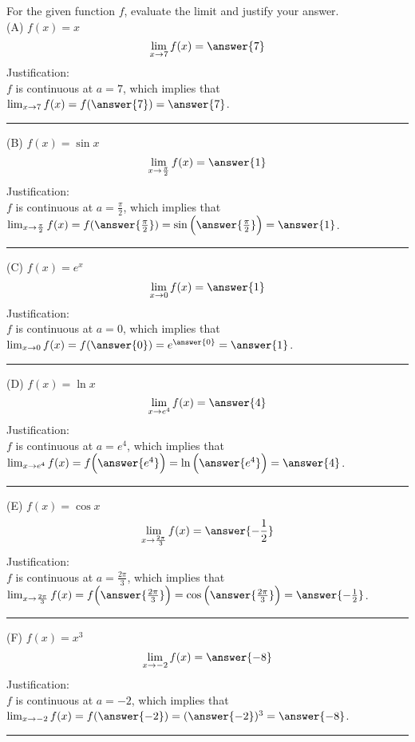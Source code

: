 \documentclass{ximera}
\author{Nela Lakos}
\begin{document}
\begin{exercise}


For the given function $f$, evaluate the limit and justify your answer.\\



(A) $f(x)=x$
 \[
\lim_{x\to 7}f(x) = \answer{7}
\] 
Justification:\\ $f$ is continuous at $a=7$, which implies that
$\lim_{x\to 7}f(x)=f(\answer{7})=\answer{7}$.

\noindent\rule[0.5ex]{\linewidth}{.2pt}

(B) $f(x)=\sin{x}$
 \[
\lim_{x\to \frac{\pi}{2}}f(x) = \answer{1}
\] 
Justification:\\ $f$ is continuous at $a=\frac{\pi}{2}$, which implies that\\[1em]
$\lim_{x\to \frac{\pi}{2}}f(x)=f(\answer{\frac{\pi}{2}})=\sin{\Bigl(\answer{\frac{\pi}{2}}\Bigr)}=\answer{1}$.

\noindent\rule[0.5ex]{\linewidth}{.2pt}

(C) $f(x)=e^{x}$
 \[
\lim_{x\to 0}f(x) = \answer{1}
\] 
Justification:\\ $f$ is continuous at $a=0$, which implies that\\[1em]
$\lim_{x\to 0}f(x)=f(\answer{0})=e^{\answer{0}}=\answer{1}$.

\noindent\rule[0.5ex]{\linewidth}{.2pt}
(D) $f(x)=\ln{x}$
 \[
\lim_{x\to e^{4}}f(x) = \answer{4}
\] 
Justification:\\ $f$ is continuous at $a=e^{4}$, which implies that\\[1em]
$\lim_{x\to e^{4}}f(x)=f\Bigl(\answer{e^{4}}\Bigr)=\ln{\Bigl(\answer{e^{4}}\Bigr)}=\answer{4}$.

\noindent\rule[0.5ex]{\linewidth}{.2pt}
(E) $f(x)=\cos{x}$
 \[
\lim_{x\to \frac{2\pi}{3}}f(x) = \answer{-\frac{1}{2}}
\] 
Justification:\\ $f$ is continuous at $a= \frac{2\pi}{3}$, which implies that\\[1em]
$\lim_{x\to \frac{2\pi}{3}}f(x)=f\Bigl(\answer{ \frac{2\pi}{3}}\Bigr)=\cos{\Bigl(\answer{ \frac{2\pi}{3}}\Bigr)}=\answer{-\frac{1}{2}}$.

\noindent\rule[0.5ex]{\linewidth}{.2pt}
(F) $f(x)=x^3$
 \[
\lim_{x\to -2}f(x) = \answer{-8}
\] 
Justification:\\ $f$ is continuous at $a=-2$, which implies that\\[1em]
$\lim_{x\to -2}f(x)=f(\answer{ -2})=(\answer{-2 })^3=\answer{-8}$.

\noindent\rule[0.5ex]{\linewidth}{.2pt}
\end{exercise}
\end{document}
